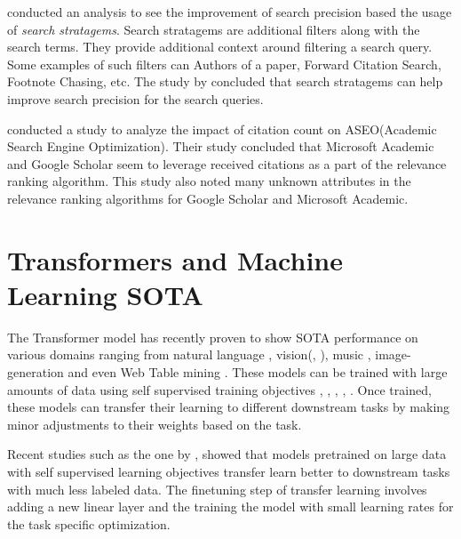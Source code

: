 \cite{kacem2018analysis} conducted an analysis to see the improvement of search precision based the usage of \textit{search stratagems}.
Search stratagems are additional filters along with the search terms. They provide additional context around filtering a search query. 
Some examples of such filters can Authors of a paper, Forward Citation Search, Footnote Chasing, etc.
The study by \cite{kacem2018analysis} concluded that search stratagems can help improve search precision for the search queries.

\cite{rovira2019ranking} conducted a study to analyze the impact of citation count on ASEO(Academic Search Engine Optimization). 
Their study concluded that Microsoft Academic and Google Scholar seem to leverage received citations as a part of the relevance 
ranking algorithm. This study also noted many unknown attributes in the relevance ranking algorithms for Google Scholar and Microsoft Academic.


\section{Transformers and Machine Learning SOTA}
The Transformer model \parencite{vaswani2017attention} has recently proven to show SOTA performance on various domains ranging from natural language \parencite{brown2020language}, vision(\cite{radford2021learning}, \cite{dosovitskiy2020image}), music \parencite{huang2018music}, image-generation \parencite{ramesh2021zero} and even Web Table mining \parencite{deng2020turl}. These models can be trained with large amounts of data using self supervised training objectives \parencite{chen2020big}, \parencite{kolesnikov2019revisiting}, \parencite{goyal2019scaling}, \parencite{gidaris2018unsupervised}, \parencite{doersch2015unsupervised}. Once trained, these models can transfer their learning to different downstream tasks by making minor adjustments to their weights \parencite{howard2018universal} based on the task.  

Recent studies such as the one by \cite{hernandez2021scaling}, showed that models pretrained on large data with self supervised learning objectives transfer learn better to downstream tasks with much less labeled data. 
The finetuning step\parencite{howard2018universal} of transfer learning involves adding a new linear layer and the training the model with small learning rates for the task specific optimization.

